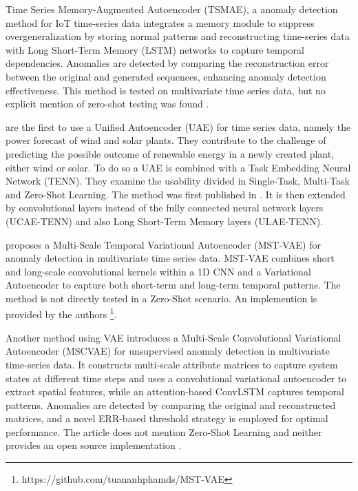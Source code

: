Time Series Memory-Augmented Autoencoder (TSMAE), a anomaly detection method for IoT time-series data integrates a memory module to suppress overgeneralization by storing normal patterns and reconstructing time-series data with Long Short-Term Memory (LSTM) networks to capture temporal dependencies. Anomalies are detected by comparing the reconstruction error between the original and generated sequences, enhancing anomaly detection effectiveness. This method is tested on multivariate time series data, but no explicit mention of zero-shot testing was found \cite{gao_tsmae_2023}.

\cite{nivarthi_multi-task_2023} are the first to use a Unified Autoencoder (UAE) for time series data, namely the power forecast of wind and solar plants. They contribute to the challenge of predicting the possible outcome of renewable energy in a newly created plant, either wind or solar. To do so a UAE is combined with a Task Embedding Neural Network (TENN). They examine the usability divided in Single-Task, Multi-Task and Zero-Shot Learning. The method was first published in \cite{nivarthi_unified_2022}. It is then extended by convolutional layers instead of the fully connected neural network layers (UCAE-TENN) and also Long Short-Term Memory layers (ULAE-TENN).

\cite{pham_mst-vae_2022} proposes a Multi-Scale Temporal Variational Autoencoder (MST-VAE) for anomaly detection in multivariate time series data. MST-VAE combines short and long-scale convolutional kernels within a 1D CNN and a Variational Autoencoder to capture both short-term and long-term temporal patterns. The method is not directly tested in a Zero-Shot scenario. An implemention is provided by the authors \footnote{\fussy\tiny https://github.com/tuananhphamds/MST-VAE}.

Another method using VAE introduces a Multi-Scale Convolutional Variational Autoencoder (MSCVAE) for unsupervised anomaly detection in multivariate time-series data. It constructs multi-scale attribute matrices to capture system states at different time steps and uses a convolutional variational autoencoder to extract spatial features, while an attention-based ConvLSTM captures temporal patterns. Anomalies are detected by comparing the original and reconstructed matrices, and a novel ERR-based threshold strategy is employed for optimal performance. The article does not mention Zero-Shot Learning and neither provides an open source implementation \cite{yookampon_robust_2022}.

